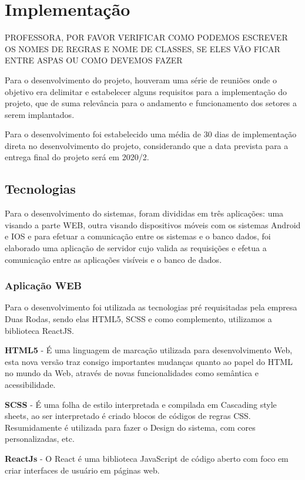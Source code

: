 \chapter{Implementação}

{\color{red} PROFESSORA, POR FAVOR VERIFICAR COMO PODEMOS ESCREVER OS NOMES DE REGRAS E NOME DE CLASSES, SE ELES VÃO FICAR ENTRE ASPAS OU COMO DEVEMOS FAZER }

Para o desenvolvimento do projeto, houveram uma série de reuniões onde o objetivo era delimitar e estabelecer alguns requisitos para a implementação do projeto, que de suma relevância para o andamento e funcionamento dos setores a serem implantados.

Para o desenvolvimento foi estabelecido uma média de 30 dias de implementação direta no desenvolvimento do projeto, considerando que a data prevista para a entrega final do projeto será em 2020/2.

\section{Tecnologias}
Para o desenvolvimento do sistemas, foram divididas em três aplicações: uma visando a parte WEB, outra visando dispositivos móveis com os sistemas Android e IOS e para efetuar a comunicação entre os sistemas e o banco dados, foi elaborado uma aplicação de servidor cujo valida as requisições e efetua a comunicação entre as aplicações visíveis e o banco de dados.

\subsection{Aplicação WEB}

Para o desenvolvimento foi utilizada as tecnologias pré requisitadas pela empresa Duas Rodas, sendo elas HTML5, SCSS e como complemento, utilizamos a biblioteca ReactJS.

{\textbf{HTML5} - É uma linguagem de marcação utilizada para desenvolvimento Web, esta nova versão traz consigo importantes mudanças quanto ao papel do HTML no mundo da Web, através de novas funcionalidades como semântica e acessibilidade.}

{\textbf{SCSS} - É uma folha de estilo interpretada e compilada em Cascading style sheets, ao ser interpretado é criado blocos de códigos de regras CSS. Resumidamente é utilizada para fazer o Design do sistema, com cores personalizadas, etc.}

{\textbf{ReactJs} - O React é uma biblioteca JavaScript de código aberto com foco em criar interfaces de usuário em páginas web.}

